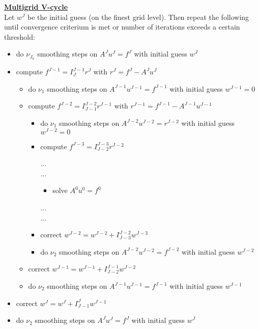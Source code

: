 \documentclass[../draft_1.tex]{subfiles}
\begin{document}
\begin{framed}
	\underline{\textbf{Multigrid V-cycle}} 
	\smallskip 
	\\
	Let $w^J$ be the initial guess (on the finest grid level). Then repeat the following until convergence criterium is met or number of iterations exceeds a certain threshold:
	
	\begin{itemize}
		\item do $\nu_{J_a}$ smoothing steps on $A^J u^J = f^J$ with initial guess $w^J$
		\item compute $f^{J-1} = I_{J}^{J-1} r^J$ with $r^J = f^J - A^Ju^J$
		\begin{itemize}
			\item do $\nu_1$ smoothing steps on $A^{J-1} u^{J-1} = f^{J-1}$ with initial guess $w^{J-1} = 0$
			\item compute $f^{J-2} = I_{J-1}^{J-2} r^{J-1}$ with $r^{J-1} = f^{J-1} - A^{J-1}u^{J-1}$
			\begin{itemize}
				\item do $\nu_1$ smoothing steps on $A^{J-2} u^{J-2} = r^{J-2}$ with initial guess $w^{J-2} = 0$ 
				\item compute $f^{J-3} = I_{J-2}^{J-3} r^{J-2}$
		
		... \\
		...
				\begin{itemize}
				\item solve $A^0 u^0 = f^0$
				\end{itemize}	
		... \\
		...
		
			\item correct $w^{J-2} = w^{J-2} + I_{J-3}^{J-2} w^{J-3}$
			\item do $\nu_2$ smoothing steps on $A^{J-2} u^{J-2} = f^{J-2}$ with initial guess $w^{J-2}$
			\end{itemize}	
		\item correct $w^{J-1} = w^{J-1} + I_{J-2}^{J-1} w^{J-2}$
		\item do $\nu_2$ smoothing steps on $A^{J-1} u^{J-1} = f^{J-1}$ with initial guess $w^{J-1}$		
			\end{itemize}	
		\item correct $w^{J} = w^{J} + I_{J-1}^{J} w^{J-1}$
		\item do $\nu_2$ smoothing steps on $A^{J} u^{J} = f^{J}$ with initial guess $w^{J}$
	\end{itemize}	
\end{framed}
\end{document}
